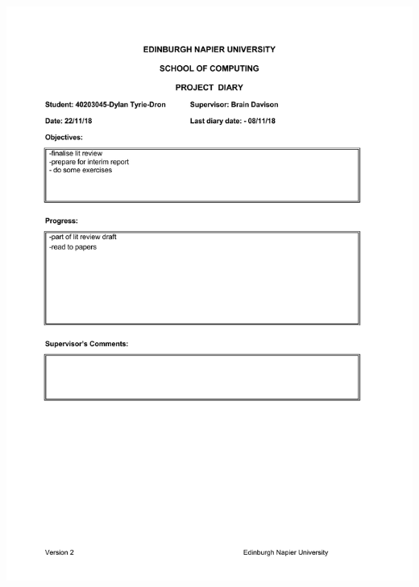 \documentclass[12pt,a4paper]{article}
\begin{document}
\begin{appendices}
\includegraphics[width=\textwidth,height=\textheight,keepaspectratio]{project_diary_7th_entry.pdf}

\end{appendices}
\end{document}
